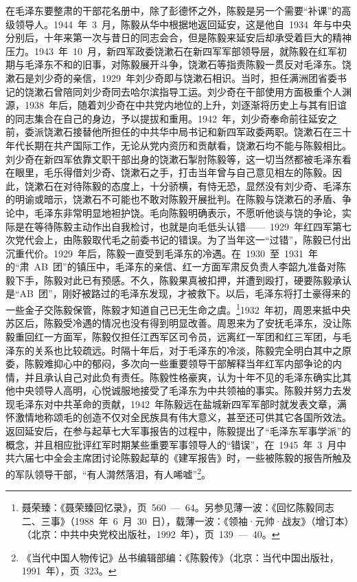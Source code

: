 在毛泽东要整肃的干部花名册中，除了彭德怀之外，陈毅是另一个需要“补课”的高级领导人。1944~年~3~月，陈毅从华中根据地返回延安，这是他自~1934~年与中央分别后，十年来第一次与昔日的同志会合，但是陈毅来延安后却承受着巨大的精神压力。1943~年~10~月，新四军政委饶漱石在新四军军部领导层，就陈毅在红军初期与毛泽东不和的旧事，对陈毅展开斗争，饶漱石等指责陈毅一贯反对毛泽东。饶漱石是刘少奇的亲信，1929~年刘少奇即与饶漱石相识。当时，担任满洲团省委书记的饶漱石曾陪同刘少奇同去哈尔滨指导工运。刘少奇在干部使用方面极重个人渊源，1938~年后，随着刘少奇在中共党内地位的上升，刘逐渐将历史上与其有旧谊的同志集合在自己的身边，予以提拔和重用。1942~年，刘少奇奉命前往延安之前，委派饶漱石接替他所担任的中共华中局书记和新四军政委两职。饶漱石在三十年代长期在共产国际工作，无论从党内资历和贡献看，饶漱石均不能与陈毅相比。刘少奇在新四军依靠文职干部出身的饶漱石掣肘陈毅等，这一切当然都被毛泽东看在眼里，毛乐得借刘少奇、饶漱石之手，打击当年曾与自己意见相左的陈毅。因此，饶漱石在对待陈毅的态度上，十分骄横，有恃无恐，显然没有刘少奇、毛泽东的明谕或暗示，饶漱石不可能也不敢对陈毅开展批判。在陈毅与饶漱石的矛盾、争论中，毛泽东非常明显地袒护饶。毛向陈毅明确表示，不愿听他谈与饶的争论，实际是在等待陈毅主动作出自我检讨，也就是向毛低头认错——~1929~年红四军第七次党代会上，由陈毅取代毛之前委书记的错误。为了当年这一“过错”，陈毅已付出沉重代价。1929~年后，陈毅一直受到毛泽东的冷遇。在~1930~至~1931~年的“肃~AB~团”的镇压中，毛泽东的亲信、红一方面军肃反负责人李韶九准备对陈毅下手，陈毅对此已有预感。不久，陈毅果真被扣押，并遭到殴打，硬要陈毅承认是“AB~团”，刚好被路过的毛泽东发现，才被救下。以后，毛泽东将打土豪得来的一些金子交陈毅保管，陈毅才知道自己已无生命之虞。\footnote{聂荣臻：《聂荣臻回忆录》，页~560~—~64。另参见薄一波：《回忆陈毅同志二、三事》（1988~年~6~月~30~日），载薄一波：《领袖·元帅·战友》（增订本）（北京：中共中央党校出版社，1992~年），页~139~—~40。}1932~年初，周恩来抵中央苏区后，陈毅受冷遇的情况也没有得到明显改善。周恩来为了安抚毛泽东，没让陈毅重回红一方面军，陈毅仅担任江西军区司令员，远离红一军团和红三军团，与毛泽东的关系也比较疏远。时隔十年后，对于毛泽东的冷淡，陈毅完全明白其中之原委，陈毅难抑心中的郁闷，多次向一些重要领导干部解释当年红军内部争论的内情，并且承认自己对此负有责任。陈毅性格豪爽，认为十年不见的毛泽东确实比其他中央领导人高明，心悦诚服地接受了毛泽东为中共领袖的事实。陈毅并努力去发现毛泽东对中共革命的贡献，1942~年陈毅远在盐城新四军军部时就发表文章，满怀激情地称颂毛的创造不仅对全民族具有伟大意义，甚至还可供其它各国所效法。返回延安后，在参与起草七大军事报告的过程中，陈毅提出了“毛泽东军事学派”的概念，并且相应批评红军时期某些重要军事领导人的“错误”，在~1945~年~3~月中共六届七中全会主席团讨论陈毅起草的《建军报告》时，一些被陈毅的报告所触及的军队领导干部，“有人潸然落泪，有人唏嘘”\footnote{《当代中国人物传记》丛书编辑部编：《陈毅传》（北京：当代中国出版社，1991~年），页~323。}。

